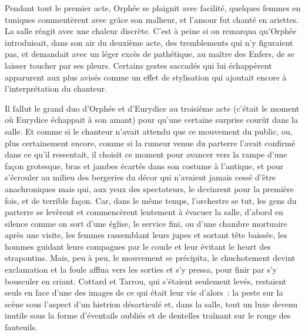 \documentclass[french,twoside]{book} %
\begin{document}
Pendant tout le premier acte, Orphée se plaignit avec facilité, quelques femmes en tuniques commentèrent avec grâce son malheur, et l’amour fut chanté en ariettes. La salle réagit avec une chaleur discrète. C’est à peine si on remarqua qu’Orphée introduisait, dans son air du deuxième acte, des tremblements qui n’y figuraient pas, et demandait avec un léger excès de pathétique, au maître des Enfers, de se laisser toucher par ses pleurs. Certains gestes saccadés qui lui échappèrent apparurent aux plus avisés comme un effet de stylisation qui ajoutait encore à l’interprétation du chanteur.\par
Il fallut le grand duo d’Orphée et d’Eurydice au troisième acte (c’était le moment où Eurydice échappait à son amant) pour qu’une certaine surprise courût dans la salle. Et comme si le chanteur n’avait attendu que ce mouvement du public, ou, plus certainement encore, comme si la rumeur venue du parterre l’avait confirmé dans ce qu’il ressentait, il choisit ce moment pour avancer vers la rampe d’une façon grotesque, bras et jambes écartés dans son costume à l’antique, et pour s’écrouler au milieu des bergeries du décor qui n’avaient jamais cessé d’être anachroniques mais qui, aux yeux des spectateurs, le devinrent pour la première fois, et de terrible façon. Car, dans le même temps, l’orchestre se tut, les gens du parterre se levèrent et commencèrent lentement à évacuer la salle, d’abord en silence comme on sort d’une église, le service fini, ou d’une chambre mortuaire après une visite, les femmes rassemblant leurs jupes et sortant tête baissée, les hommes guidant leurs compagnes par le coude et leur évitant le heurt des strapontins. Mais, peu à peu, le mouvement se précipita, le chuchotement devint exclamation et la foule afflua vers les sorties et s’y pressa, pour finir par s’y bousculer en criant. Cottard et Tarrou, qui s’étaient seulement levés, restaient seuls en face d’une des images de ce qui était leur vie d’alors : la peste sur la scène sous l’aspect d’un histrion désarticulé et, dans la salle, tout un luxe devenu inutile sous la forme d’éventails oubliés et de dentelles traînant sur le rouge des fauteuils.
\end{document}
